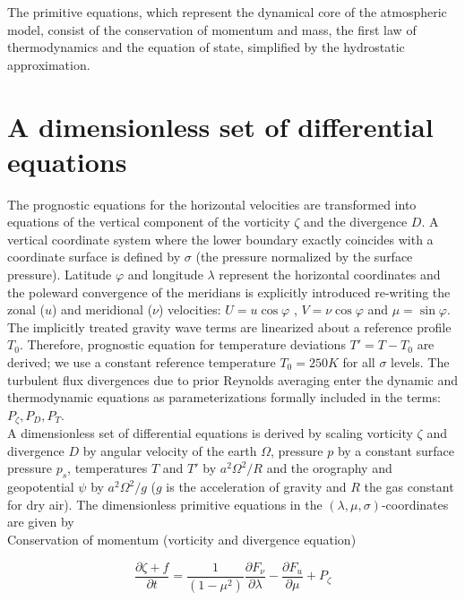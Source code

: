 The primitive equations, which represent the dynamical core of the 
atmospheric model,
consist of the conservation of momentum and mass, the first law of 
thermodynamics and the equation of state, simplified by the hydrostatic 
approximation. 


\section{A dimensionless set of differential equations \label{EQ}}
The prognostic equations for the horizontal velocities are 
transformed into equations of the vertical component of the vorticity $\zeta$ 
and the divergence $D$. 
A vertical coordinate system where the lower boundary
exactly coincides with a coordinate surface is defined
by $\sigma$ (the pressure normalized by 
the surface pressure).
Latitude $\varphi$ and longitude $\lambda$ represent the horizontal 
coordinates and the poleward convergence of the meridians is explicitly 
introduced re-writing the zonal ($u$) and meridional ($\nu$) velocities: 
$U= u \cos \varphi$ , $V= \nu \cos \varphi$ and $\mu = \sin \varphi$.
The implicitly treated gravity wave terms
are linearized about a reference profile $T_0$.
Therefore, prognostic equation for
temperature deviations $T'=T-T_0$ are derived; 
we use a constant reference temperature $T_0=250K$ for all
$\sigma$ levels.
The turbulent flux divergences due to prior Reynolds averaging
enter the dynamic and thermodynamic equations as parameterizations formally 
included in the terms: $P_\zeta , P_D , P_T$.\\


A dimensionless set of differential equations is derived
by scaling vorticity $\zeta$ and divergence $D$ 
by angular velocity of the earth 
$\Omega$, pressure $p$ by a 
constant surface
pressure $p_s$, temperatures $T$ and $T'$ by $a^2 \Omega^2 /R$ and 
the orography and geopotential $\psi$
by $a^2 \Omega^2 / g$ ($g$ is the acceleration of gravity
and $R$ the gas constant for dry air). 
The dimensionless primitive
equations in the $(\lambda , \mu, \sigma)$-coordinates
\cite{hoskins} are given by\\


Conservation of momentum (vorticity  and divergence equation)

\begin{equation}
{\displaystyle \frac{\partial \zeta + f}{\partial t} = \frac{1}{(1 - \mu^2)} \frac{\partial F_\nu}{\partial \lambda} - \frac{\partial F_u}{\partial \mu} + P_\zeta} \label{vort}
\end{equation}

